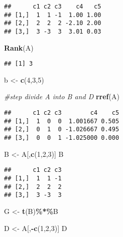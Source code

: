 \documentclass[
]{article}
\newenvironment{Shaded}{\begin{snugshade}}{\end{snugshade}}
\newcommand{\CommentTok}[1]{\textcolor[rgb]{0.56,0.35,0.01}{\textit{#1}}}
\newcommand{\DecValTok}[1]{\textcolor[rgb]{0.00,0.00,0.81}{#1}}
\newcommand{\FunctionTok}[1]{\textcolor[rgb]{0.13,0.29,0.53}{\textbf{#1}}}
\newcommand{\NormalTok}[1]{#1}
\newcommand{\OtherTok}[1]{\textcolor[rgb]{0.56,0.35,0.01}{#1}}
\newcommand{\SpecialCharTok}[1]{\textcolor[rgb]{0.81,0.36,0.00}{\textbf{#1}}}
\begin{document}
\begin{verbatim}
##      c1 c2 c3    c4   c5
## [1,]  1  1 -1  1.00 1.00
## [2,]  2  2  2 -2.10 2.00
## [3,]  3 -3  3  3.01 0.03
\end{verbatim}

\begin{Shaded}
\begin{Highlighting}[]
\FunctionTok{Rank}\NormalTok{(A)}
\end{Highlighting}
\end{Shaded}

\begin{verbatim}
## [1] 3
\end{verbatim}

\begin{Shaded}
\begin{Highlighting}[]
\NormalTok{b }\OtherTok{\textless{}{-}} \FunctionTok{c}\NormalTok{(}\DecValTok{4}\NormalTok{,}\DecValTok{3}\NormalTok{,}\DecValTok{5}\NormalTok{)}

\CommentTok{\#step divide A into B and D}
\FunctionTok{rref}\NormalTok{(A)}
\end{Highlighting}
\end{Shaded}

\begin{verbatim}
##      c1 c2 c3        c4    c5
## [1,]  1  0  0  1.001667 0.505
## [2,]  0  1  0 -1.026667 0.495
## [3,]  0  0  1 -1.025000 0.000
\end{verbatim}

\begin{Shaded}
\begin{Highlighting}[]
\NormalTok{B }\OtherTok{\textless{}{-}}\NormalTok{ A[,}\FunctionTok{c}\NormalTok{(}\DecValTok{1}\NormalTok{,}\DecValTok{2}\NormalTok{,}\DecValTok{3}\NormalTok{)]}
\NormalTok{B}
\end{Highlighting}
\end{Shaded}

\begin{verbatim}
##      c1 c2 c3
## [1,]  1  1 -1
## [2,]  2  2  2
## [3,]  3 -3  3
\end{verbatim}

\begin{Shaded}
\begin{Highlighting}[]
\NormalTok{G }\OtherTok{\textless{}{-}} \FunctionTok{t}\NormalTok{(B)}\SpecialCharTok{\%*\%}\NormalTok{B}

\NormalTok{D }\OtherTok{\textless{}{-}}\NormalTok{ A[,}\SpecialCharTok{{-}}\FunctionTok{c}\NormalTok{(}\DecValTok{1}\NormalTok{,}\DecValTok{2}\NormalTok{,}\DecValTok{3}\NormalTok{)]}
\NormalTok{D}
\end{Highlighting}
\end{Shaded}
\end{document}
